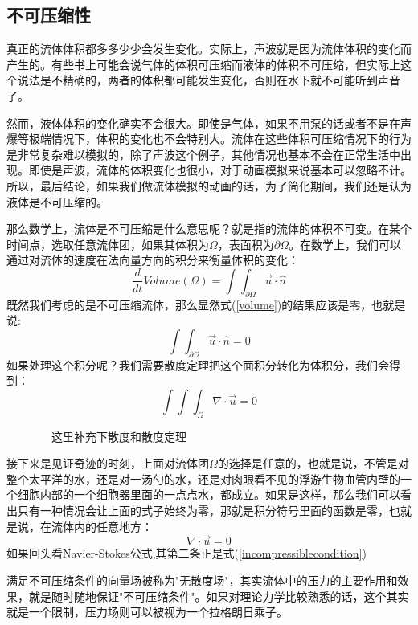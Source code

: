 \documentclass{article}
\begin{document}
\subsection{不可压缩性}
真正的流体体积都多多少少会发生变化。实际上，声波就是因为流体体积的变化而产生的。有些书上可能会说气体的体积可压缩而液体的体积不可压缩，但实际上这个说法是不精确的，两者的体积都可能发生变化，否则在水下就不可能听到声音了。\par
然而，液体体积的变化确实不会很大。即使是气体，如果不用泵的话或者不是在声爆等极端情况下，体积的变化也不会特别大。流体在这些体积可压缩情况下的行为是非常复杂难以模拟的，除了声波这个例子，其他情况也基本不会在正常生活中出现。即使是声波，流体的体积变化也很小，对于动画模拟来说基本可以忽略不计。所以，最后结论，如果我们做流体模拟的动画的话，为了简化期间，我们还是认为液体是不可压缩的。\par
那么数学上，流体是不可压缩是什么意思呢？就是指的流体的体积不可变。在某个时间点，选取任意流体团，如果其体积为$\Omega$，表面积为$\partial{\Omega}$。在数学上，我们可以通过对流体的速度在法向量方向的积分来衡量体积的变化：
\begin{equation}
\frac{d}{dt}Volume(\Omega)=\int\int_{\partial{\Omega}}{\vec{u}\cdot{\hat{n}}} \label{volume}
\end{equation}
既然我们考虑的是不可压缩流体，那么显然式(\ref{volume})的结果应该是零，也就是说:
\begin{equation}
\int\int_{\partial{\Omega}}{\vec{u}\cdot{\hat{n}}}=0 \label{volumezero}
\end{equation}
如果处理这个积分呢？我们需要散度定理把这个面积分转化为体积分，我们会得到：
\begin{equation}
\int\int\int_{\Omega}\nabla\cdot\vec{u}=0
\end{equation}

~~~~~~~~这里补充下散度和散度定理~~~~~~~~~~~~~~~~~~~~~~


接下来是见证奇迹的时刻，上面对流体团$\Omega$的选择是任意的，也就是说，不管是对整个太平洋的水，还是对一汤勺的水，还是对肉眼看不见的浮游生物血管内壁的一个细胞内部的一个细胞器里面的一点点水，都成立。如果是这样，那么我们可以看出只有一种情况会让上面的式子始终为零，那就是积分符号里面的函数是零，也就是说，在流体内的任意地方：
\begin{equation}
\nabla\cdot\vec{u}=0 \label{incompressiblecondition}
\end{equation}
如果回头看Navier-Stokes公式,其第二条正是式(\ref{incompressiblecondition})\par
满足不可压缩条件的向量场被称为"无散度场"，其实流体中的压力的主要作用和效果，就是随时随地保证"不可压缩条件"。如果对理论力学比较熟悉的话，这个其实就是一个限制，压力场则可以被视为一个拉格朗日乘子。
\end{document}
